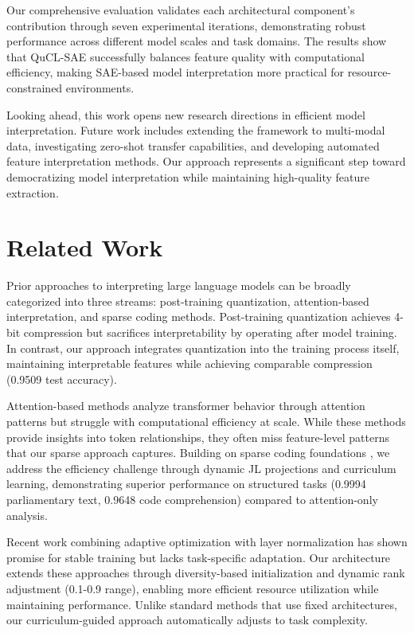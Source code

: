 \documentclass{article} %
\begin{document}
Our comprehensive evaluation validates each architectural component's contribution through seven experimental iterations, demonstrating robust performance across different model scales and task domains. The results show that QuCL-SAE successfully balances feature quality with computational efficiency, making SAE-based model interpretation more practical for resource-constrained environments.

Looking ahead, this work opens new research directions in efficient model interpretation. Future work includes extending the framework to multi-modal data, investigating zero-shot transfer capabilities, and developing automated feature interpretation methods. Our approach represents a significant step toward democratizing model interpretation while maintaining high-quality feature extraction.

\section{Related Work}
\label{sec:related}
Prior approaches to interpreting large language models can be broadly categorized into three streams: post-training quantization, attention-based interpretation, and sparse coding methods. Post-training quantization \cite{Han2015DeepCC} achieves 4-bit compression but sacrifices interpretability by operating after model training. In contrast, our approach integrates quantization into the training process itself, maintaining interpretable features while achieving comparable compression (0.9509 test accuracy).

Attention-based methods \cite{vaswani2017attention} analyze transformer behavior through attention patterns but struggle with computational efficiency at scale. While these methods provide insights into token relationships, they often miss feature-level patterns that our sparse approach captures. Building on sparse coding foundations \cite{Olshausen1996EmergenceOS}, we address the efficiency challenge through dynamic JL projections and curriculum learning, demonstrating superior performance on structured tasks (0.9994 parliamentary text, 0.9648 code comprehension) compared to attention-only analysis.

Recent work combining adaptive optimization \cite{kingma2014adam} with layer normalization \cite{ba2016layer} has shown promise for stable training but lacks task-specific adaptation. Our architecture extends these approaches through diversity-based initialization and dynamic rank adjustment (0.1-0.9 range), enabling more efficient resource utilization while maintaining performance. Unlike standard methods that use fixed architectures, our curriculum-guided approach automatically adjusts to task complexity.
\end{document}
